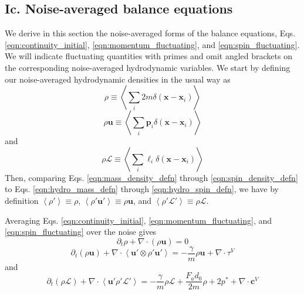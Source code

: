 \documentclass[%
 reprint,
superscriptaddress,
longbibliography,
 amsmath,amssymb,
 prl,
 citeautoscript,
]{revtex4-1}
\begin{document}
\subsection{Ic. Noise-averaged balance equations}

We derive in this section the noise-averaged forms of the balance equations, Eqs. \ref{eqn:continuity_initial}, \ref{eqn:momentum_fluctuating}, and \ref{eqn:spin_fluctuating}. We will indicate fluctuating quantities with primes and omit angled brackets on the corresponding noise-averaged hydrodynamic variables. We start by defining our noise-averaged hydrodynamic densities in the usual way as \cite{Irving+Kirkwood}
\begin{equation}
\rho \equiv \left\langle \sum_i 2 m \delta \left( {\boldsymbol x} - {\boldsymbol x}_i \right) \right\rangle
\label{eqn:hydro_mass_defn}
\end{equation}
\begin{equation}
\rho {\boldsymbol u} \equiv \left\langle \sum_i {\boldsymbol p}_i \delta \left( {\boldsymbol x} - {\boldsymbol x}_i \right) \right\rangle
\label{eqn:hydro_velocity_defn}
\end{equation}
and
\begin{equation}
\rho \mathcal{L} \equiv \left\langle \sum_i \ell_i \delta \left( {\boldsymbol x} - {\boldsymbol x}_i \right) \right\rangle
\label{eqn:hydro_spin_defn}
\end{equation}
Then, comparing Eqs. \ref{eqn:mass_density_defn} through \ref{eqn:spin_density_defn} to Eqs. \ref{eqn:hydro_mass_defn} through \ref{eqn:hydro_spin_defn}, we have by definition $\left\langle \rho' \right\rangle \equiv \rho$, $\left\langle \rho' {\boldsymbol u}' \right\rangle \equiv \rho {\boldsymbol u}$, and $\left\langle \rho' \mathcal{L}' \right\rangle \equiv \rho \mathcal{L}$.

Averaging Eqs. \ref{eqn:continuity_initial}, \ref{eqn:momentum_fluctuating}, and \ref{eqn:spin_fluctuating} over the noise gives
\begin{equation}
\partial_t \rho + \nabla \cdot \left( \rho {\boldsymbol u} \right) = 0
\label{eqn:continuity_noise_averaged}
\end{equation}
\begin{equation}
\partial_t \left( \rho {\boldsymbol u} \right) + \nabla \cdot \left\langle {\boldsymbol u}' \otimes \rho' {\boldsymbol u}' \right\rangle = - \frac{\gamma}{m} \rho {\boldsymbol u} + \nabla \cdot \tau^V
\label{eqn:momentum_noise_averaged1}
\end{equation}
and
\begin{equation}
\partial_t \left( \rho \mathcal{L} \right) + \nabla \cdot \left\langle {\boldsymbol u}' \rho' \mathcal{L}' \right\rangle = - \frac{\gamma}{m} \rho \mathcal{L} + \frac{F_a d_0}{2m} \rho + 2 p^* + \nabla \cdot {\boldsymbol c}^V
\label{eqn:spin_noise_averaged1}
\end{equation}
\end{document}
